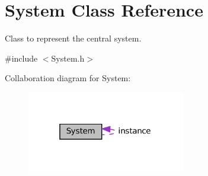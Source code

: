 \hypertarget{classSystem}{}\section{System Class Reference}
\label{classSystem}


Class to represent the central system.  




{\ttfamily \#include $<$System.\+h$>$}



Collaboration diagram for System\+:
\nopagebreak
\begin{figure}[H]
\begin{center}
\leavevmode
\includegraphics[width=196pt]{classSystem__coll__graph}
\end{center}
\end{figure}

